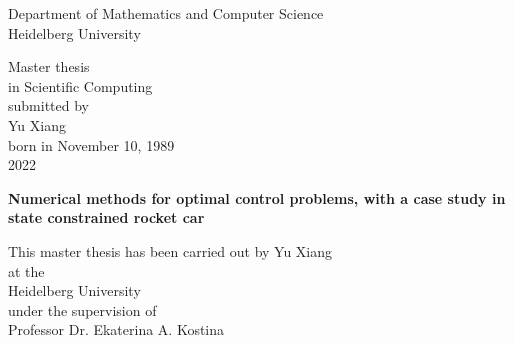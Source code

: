 
\thispagestyle{empty}
\begin{center}
  \renewcommand{\baselinestretch}{2.00}
  \Large\sffamily
  Department of Mathematics and Computer Science\\
  \large Heidelberg University
  \par\vfill\normalfont
  Master thesis\\
  in Scientific Computing\\
  submitted by\\
  Yu Xiang\\
  born in November 10, 1989\\
  2022
\end{center}
\newpage

\thispagestyle{empty}
\begin{center}
  \renewcommand{\baselinestretch}{2.00}
  \Large\bfseries\sffamily
    Numerical methods for optimal control problems, with a case study in state constrained rocket car %
  \par
  \vfill
  \large\normalfont
  This master thesis has been carried out by Yu Xiang\\
  at the\\
  Heidelberg University \\
  under the supervision of\\
  Professor Dr. Ekaterina A. Kostina
\end{center}\par
\vspace{5\baselineskip}

\renewcommand{\baselinestretch}{1.00}\normalsize